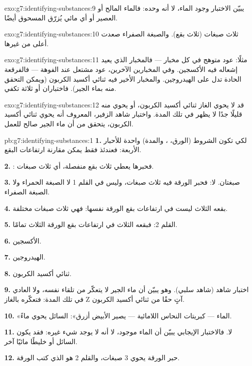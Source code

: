 \begin{solution}{exo:g7:identifying-substances:9}
يبيّن الاختبار وجود الماء، لا أنه وحده: فالماء المالح أو العصير أو أي 
مائي يُزرّق المسحوق أيضًا.
\end{solution}

\begin{solution}{exo:g7:identifying-substances:10}
ثلاث صبغات (ثلاث بقع). والصبغة الصفراء صعدت أعلى من غيرها.
\end{solution}

\begin{solution}{exo:g7:identifying-substances:11}
مثلًا: عود متوهج في كل مخبار --- فالمخبار الذي يعيد إشعاله فيه الأكسجين.
وفي المخبارين الآخرين، عود مشتعل عند الفوهة --- فالفرقعة الحادة تدل على
الهيدروجين. والمخبار الأخير فيه ثنائي أكسيد الكربون (ويمكن التحقق منه
بماء الجير). فاختباران أو ثلاثة تكفي.
\end{solution}

\begin{solution}{exo:g7:identifying-substances:12}
قد لا يحوي الغاز ثنائي أكسيد الكربون، أو يحوي منه قليلًا جدًا لا يظهر في
تلك المدة. واختبار شاهد  الزفير، المعروف أنه يحوي ثنائي أكسيد
الكربون، يتحقق من أن ماء الجير صالح للعمل.
\end{solution}

\begin{solution}{pb:g7:identifying-substances:1}
\textbf{1.} لكي تكون الشروط (الورق، ، والمدة) واحدة للأحبار
الأربعة: فعندئذ فقط يمكن مقارنة ارتفاعات البقع.

\textbf{2.} : فحبرها يعطي ثلاث بقع منفصلة، أي ثلاث صبغات.

\textbf{3.} صبغتان. لا: فحبر الورقة فيه ثلاث صبغات، وليس في القلم 1 لا
الصبغة الحمراء ولا الصبغة الصفراء.

\textbf{4.} بقعه الثلاث ليست في ارتفاعات بقع الورقة نفسها: فهي ثلاث
صبغات مختلفة.

\textbf{5.} القلم 2: فبقعه الثلاث في ارتفاعات بقع الورقة الثلاث
تمامًا.

\textbf{6.} الأكسجين.

\textbf{7.} الهيدروجين.

\textbf{8.} ثنائي أكسيد الكربون.

\textbf{9.} اختبار شاهد (شاهد سلبي). وهو يبيّن أن ماء الجير لا يتعكّر
من تلقاء نفسه، ولا  العادي في تلك المدة: فتعكّره بالغاز Z آتٍ حقًا
من ثنائي أكسيد الكربون.

\textbf{10.} «الماء --- كبريتات النحاس اللامائية --- يصير الأبيض أزرق»:
السائل يحوي ماءً.

\textbf{11.} لا. فالاختبار الإيجابي يبيّن أن الماء موجود، لا أنه لا يوجد
شيء غيره: فقد يكون السائل  أو خليطًا مائيًا آخر.

\textbf{12.} حبر الورقة يحوي 3 صبغات، والقلم 2 هو الذي كتب
الورقة.
\end{solution}
